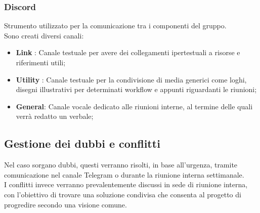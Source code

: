         \subsubsection{Discord}
        Strumento utilizzato per la comunicazione tra i componenti del gruppo.\\
        Sono creati diversi canali:
        \begin{itemize}
            \item \textbf{Link} : Canale testuale per avere dei collegamenti ipertestuali a risorse e riferimenti utili;
            \item \textbf{Utility} : Canale testuale per la condivisione di media generici come loghi, disegni illustrativi per determinati workflow e appunti riguardanti le riunioni;
            \item \textbf{General}: Canale vocale dedicato alle riunioni interne, al termine delle quali verrà redatto un verbale;
        \end{itemize}

    \subsection{Gestione dei dubbi e conflitti}
        Nel caso sorgano dubbi, questi verranno risolti, in base all'urgenza, 
        tramite comunicazione nel canale Telegram o durante la riunione interna 
        settimanale. \\
        I conflitti invece verranno prevalentemente discussi in sede di riunione 
        interna, con l'obiettivo di trovare una soluzione condivisa che consenta 
        al progetto di progredire secondo una visione comune.